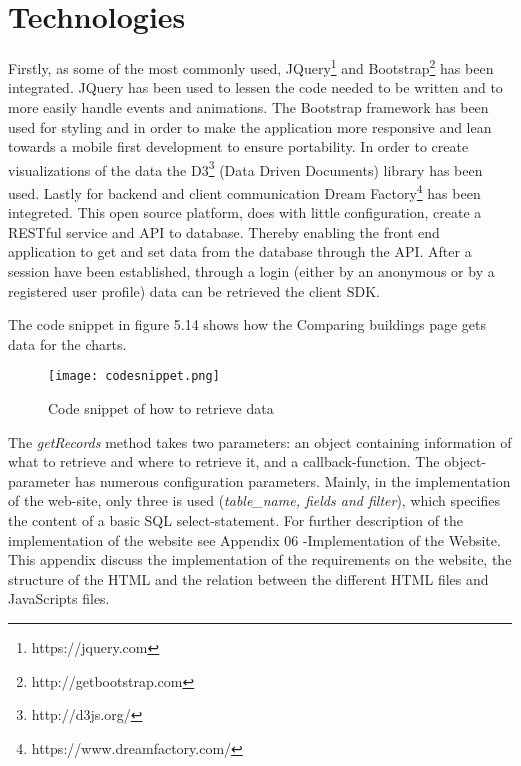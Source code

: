 \section*{Technologies}
Firstly, as some of the most commonly used, JQuery\footnote{https://jquery.com} and Bootstrap\footnote{http://getbootstrap.com} has been integrated. JQuery has been used to lessen the code needed to be written and to more easily handle events and animations. The Bootstrap framework has been used for styling and in order to make the application more responsive and lean towards a mobile first development to ensure portability.  
In order to create visualizations of the data the D3\footnote{http://d3js.org/} (Data Driven Documents) library has been used. Lastly for backend and client communication Dream Factory\footnote{https://www.dreamfactory.com/} has been integreted. This open source platform, does with little configuration, create a RESTful service and API to database. Thereby enabling the front end application to get and set data from the database through the API. 
After a session have been established, through a login (either by an anonymous or by a registered user profile) data can be retrieved the client SDK. 

The code snippet in figure 5.14 shows how the Comparing buildings page gets data for the charts.
\begin{figure}
\begin{center}
\texttt{[image: codesnippet.png]}
\end{center}
\caption{Code snippet of how to retrieve data}
\end{figure}
The \emph{getRecords} method takes two parameters: an object containing information of what to retrieve and where to retrieve it, and a callback-function.
The object-parameter has numerous configuration parameters. Mainly, in the implementation of the web-site, only three is used (\emph{table\_name, fields and filter}), which specifies the content of a basic SQL select-statement.
\newline
\newline
For further description of the implementation of the website see Appendix 06 -Implementation of the Website. This appendix discuss the implementation of the requirements on the website, the structure of the HTML and the relation between the different  HTML files and JavaScripts files.



